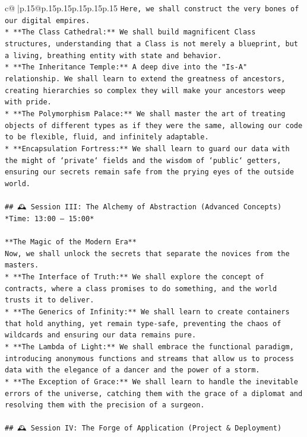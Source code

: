 \documentclass{article}
\begin{document}
{\begin{supertabular}{c@{$\;$}|p{.15\linewidth}@{}p{.15\linewidth}p{.15\linewidth}p{.15\linewidth}p{.15\linewidth}p{.15\linewidth}}
{{{\texttt{Here, we shall construct the very bones of our digital empires.} \\
\texttt{*   **The Class Cathedral:** We shall build magnificent Class structures, understanding that a Class is not merely a blueprint, but a living, breathing entity with state and behavior.} \\
\texttt{*   **The Inheritance Temple:** A deep dive into the "Is{-}A" relationship. We shall learn to extend the greatness of ancestors, creating hierarchies so complex they will make your ancestors weep with pride.} \\
\texttt{*   **The Polymorphism Palace:** We shall master the art of treating objects of different types as if they were the same, allowing our code to be flexible, fluid, and infinitely adaptable.} \\
\texttt{*   **Encapsulation Fortress:** We shall learn to guard our data with the might of `private` fields and the wisdom of `public` getters, ensuring our secrets remain safe from the prying eyes of the outside world.} \\
\\ 
\texttt{\#\# 🕰️ Session III: The Alchemy of Abstraction (Advanced Concepts)} \\
\texttt{*Time: 13:00 – 15:00*} \\
\\ 
\texttt{**The Magic of the Modern Era**} \\
\texttt{Now, we shall unlock the secrets that separate the novices from the masters.} \\
\texttt{*   **The Interface of Truth:** We shall explore the concept of contracts, where a class promises to do something, and the world trusts it to deliver.} \\
\texttt{*   **The Generics of Infinity:** We shall learn to create containers that hold anything, yet remain type{-}safe, preventing the chaos of wildcards and ensuring our data remains pure.} \\
\texttt{*   **The Lambda of Light:** We shall embrace the functional paradigm, introducing anonymous functions and streams that allow us to process data with the elegance of a dancer and the power of a storm.} \\
\texttt{*   **The Exception of Grace:** We shall learn to handle the inevitable errors of the universe, catching them with the grace of a diplomat and resolving them with the precision of a surgeon.} \\
\\ 
\texttt{\#\# 🕰️ Session IV: The Forge of Application (Project \& Deployment)} \\
}}}
\end{supertabular}}
\end{document}
